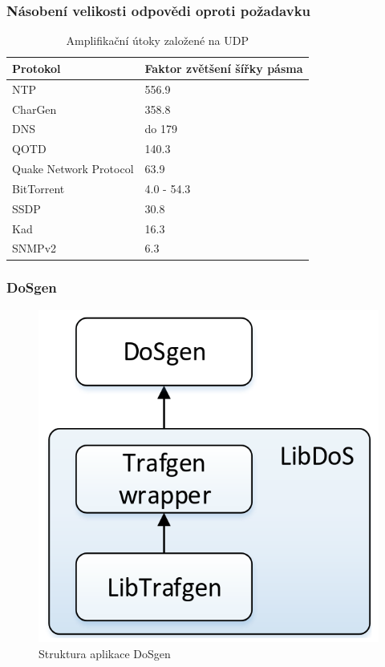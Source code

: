 \documentclass[%
  12pt,       				%
	t,                  %
	aspectratio=1610,   %
	unicode,						%
czech,              %
]{beamer}				    	%
\begin{document}
\begin{frame} 
	\frametitle{Násobení velikosti odpovědi oproti požadavku}
	\vspace{0.5cm}
		\begin{table}[ht]
			\centering
			\caption{Amplifikační útoky založené na UDP}
			\label{tab:udp_ampl}
			\begin{tabular}{|l|l|}
				\hline
				\textbf{Protokol}      & \textbf{Faktor zvětšení šířky pásma}    \\ \hline
				NTP                    & 556.9                                   \\ \hline
				CharGen                & 358.8                                   \\ \hline
				DNS                    & do 179                                  \\ \hline
				QOTD                   & 140.3                                   \\ \hline
				Quake Network Protocol & 63.9                                    \\ \hline
				BitTorrent             & 4.0 - 54.3                              \\ \hline
				SSDP                   & 30.8                                    \\ \hline
				Kad                    & 16.3                                    \\ \hline
				SNMPv2                 & 6.3                                     \\ \hline
			\end{tabular}
	\end{table}
\end{frame}

\begin{frame} 
\frametitle{DoSgen}
		\begin{figure}%
			\centering
			\vspace{0.3cm}	              %
			\includegraphics[width=0.4\columnwidth]{obrazky/dosgen_halaska_diagrampng.png}
			\caption{Struktura aplikace DoSgen}%
		\end{figure} 
\end{frame}
\end{document}
